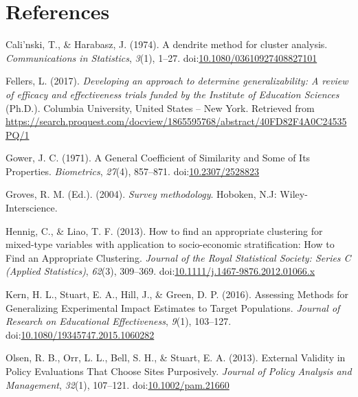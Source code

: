 \documentclass[man,floatsintext]{apa6}
\begin{document}
\hypertarget{references}{%
\section{References}\label{references}}

\begingroup
\setlength{\parindent}{-0.5in}
\setlength{\leftskip}{0.5in}

\hypertarget{refs}{}
\leavevmode\hypertarget{ref-calinskiDendriteMethodCluster1974}{}%
Cali\a'nski, T., \& Harabasz, J. (1974). A dendrite method for cluster analysis. \emph{Communications in Statistics}, \emph{3}(1), 1--27. doi:\href{https://doi.org/10.1080/03610927408827101}{10.1080/03610927408827101}

\leavevmode\hypertarget{ref-fellersDevelopingApproachDetermine2017}{}%
Fellers, L. (2017). \emph{Developing an approach to determine generalizability: A review of efficacy and effectiveness trials funded by the Institute of Education Sciences} (Ph.D.). Columbia University, United States -- New York. Retrieved from \url{https://search.proquest.com/docview/1865595768/abstract/40FD82F4A0C24535PQ/1}

\leavevmode\hypertarget{ref-gowerGeneralCoefficientSimilarity1971}{}%
Gower, J. C. (1971). A General Coefficient of Similarity and Some of Its Properties. \emph{Biometrics}, \emph{27}(4), 857--871. doi:\href{https://doi.org/10.2307/2528823}{10.2307/2528823}

\leavevmode\hypertarget{ref-grovesSurveyMethodology2004}{}%
Groves, R. M. (Ed.). (2004). \emph{Survey methodology}. Hoboken, N.J: Wiley-Interscience.

\leavevmode\hypertarget{ref-hennigHowFindAppropriate2013}{}%
Hennig, C., \& Liao, T. F. (2013). How to find an appropriate clustering for mixed-type variables with application to socio-economic stratification: How to Find an Appropriate Clustering. \emph{Journal of the Royal Statistical Society: Series C (Applied Statistics)}, \emph{62}(3), 309--369. doi:\href{https://doi.org/10.1111/j.1467-9876.2012.01066.x}{10.1111/j.1467-9876.2012.01066.x}

\leavevmode\hypertarget{ref-kernAssessingMethodsGeneralizing2016}{}%
Kern, H. L., Stuart, E. A., Hill, J., \& Green, D. P. (2016). Assessing Methods for Generalizing Experimental Impact Estimates to Target Populations. \emph{Journal of Research on Educational Effectiveness}, \emph{9}(1), 103--127. doi:\href{https://doi.org/10.1080/19345747.2015.1060282}{10.1080/19345747.2015.1060282}

\leavevmode\hypertarget{ref-olsenExternalValidityPolicy2013}{}%
Olsen, R. B., Orr, L. L., Bell, S. H., \& Stuart, E. A. (2013). External Validity in Policy Evaluations That Choose Sites Purposively. \emph{Journal of Policy Analysis and Management}, \emph{32}(1), 107--121. doi:\href{https://doi.org/10.1002/pam.21660}{10.1002/pam.21660}
\end{document}
